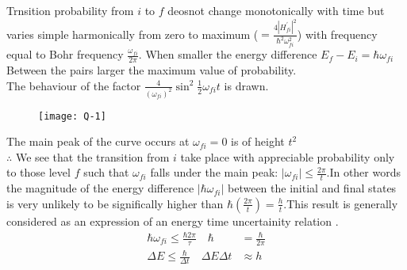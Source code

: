 Trnsition probability from $i$ to $f$ deosnot change monotonically with time but varies simple harmonically from zero to maximum ($=\frac{4|H^\prime_{fi}|^2}{\hbar^2\omega_{fi}^2}$) with frequency equal to Bohr frequency $\frac{\omega_{fi}}{2\pi}$. When smaller the energy difference $E_f-E_i=\hbar\omega_{fi}$ Between the pairs larger the maximum value of probability.\\
The behaviour of the factor $\frac{4}{(\omega_{fi})^2}\sin^2\frac{1}{2}\omega_{fi}t$ is drawn.\\
\begin{figure}[H]
	\centering
	\texttt{[image: Q-1]}
\end{figure}
The main peak of the curve occurs at $\omega_{fi}=0$ is of height $t^2$\\
$\therefore$ We see that the transition from $i$ take place with appreciable probability only to those level $f$ such that $\omega_{fi}$ falls under the main peak: $|\omega_{fi}|\leq \frac{2\pi}{t}$.In other words the magnitude of the energy difference
$|\hbar\omega_{fi}|$ between the initial and final states is very unlikely to be significally higher than $\hbar(\frac{2\pi}{t})=\frac{h}{t}$.This result is  generally considered as an expression of an energy time uncertainity relation .
	$$
	\begin{aligned}
	\hbar\omega_{fi}\leq\frac{\hbar2\pi}{\tau}\quad\hbar&=\frac{\hbar}{2\pi}\\
	\Delta E\leq \frac{\hbar}{\Delta t}\quad \Delta E\Delta t&\approx h
\end{aligned}
$$



